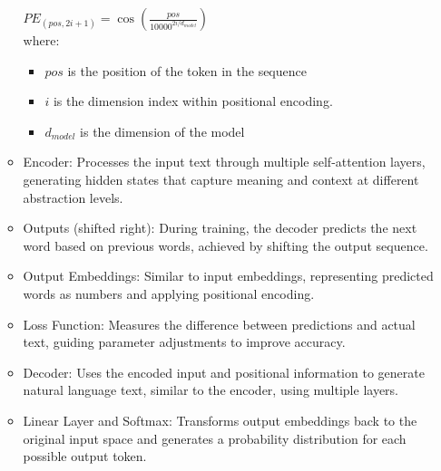 \documentclass[preprint,12pt]{elsarticle}
\begin{document}
\begin{itemize}
\begin{itemize}
		$P E_{(pos,2i+1)}=\cos (\frac{pos}{10000^{2i/{d_{model}}}})$\\
		where:
		\begin{itemize}
			\item $pos$ is the position of the token in the sequence
			\item $i$ is the dimension index within positional encoding.
			\item $d_{model}$ is the dimension of the model
		\end{itemize}
		
		
		
		\item Encoder: Processes the input text through multiple self-attention layers, generating hidden states that capture meaning and context at different abstraction levels.
		
		\item Outputs (shifted right): During training, the decoder predicts the next word based on previous words, achieved by shifting the output sequence.
		\item Output Embeddings: Similar to input embeddings, representing predicted words as numbers and applying positional encoding.
		\item Loss Function: Measures the difference between predictions and actual text, guiding parameter adjustments to improve accuracy.
		\item Decoder: Uses the encoded input and positional information to generate natural language text, similar to the encoder, using multiple layers.
		\item Linear Layer and Softmax: Transforms output embeddings back to the original input space and generates a probability distribution for each possible output token.
	\end{itemize}
\end{itemize}
\end{document}
